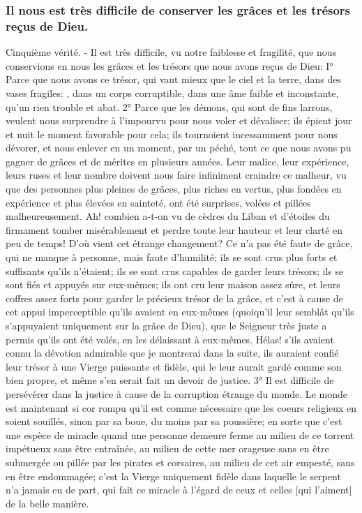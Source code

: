 \subsubsection{Il nous est très difficile de conserver les grâces et les trésors reçus de Dieu.}
 Cinquième vérité. - Il est très difficile, vu notre faiblesse et fragilité, que nous conservions en nous les grâces
et les trésors que nous avons reçus de Dieu:
I° Parce que nous avons ce trésor, qui vaut mieux que le ciel et la terre, dans des vases fragiles: , dans un corps corruptible, dans une âme faible et inconstante, qu'un rien
trouble et abat.
 2° Parce que les démons, qui sont de fins larrons, veulent nous surprendre à l'impourvu pour nous voler et
dévaliser; ils épient jour et nuit le moment favorable pour cela; ils tournoient incessamment pour nous dévorer, et
nous enlever en un moment, par un péché, tout ce que nous avons pu gagner de grâces et de mérites en plusieurs
années. Leur malice, leur expérience, leurs ruses et leur nombre doivent nous faire infiniment craindre ce malheur,
vu que des personnes plus pleines de grâces, plus riches en vertus, plus fondées en expérience et plus élevées
en sainteté, ont été surprises, volées et pillées malheureusement. Ah! combien a-t-on vu de cèdres du Liban et
d'étoiles du firmament tomber misérablement et perdre toute leur hauteur et leur clarté en peu de temps! D'où vient
cet étrange changement? Ce n'a pas été faute de grâce, qui ne manque à personne, mais faute d'humilité; ils se
sont crus plus forts et suffisants qu'ils n'étaient; ils se sont crus capables de garder leurs trésors; ils se sont fiés et
appuyés sur eux-mêmes; ils ont cru leur maison assez sûre, et leurs coffres assez forts pour garder le précieux
trésor de la grâce, et c'est à cause de cet appui imperceptible qu'ils avaient en eux-mêmes (quoiqu'il leur semblât
qu'ils s'appuyaient uniquement sur la grâce de Dieu), que le Seigneur très juste a permis qu'ils ont été volés, en les
délaissant à eux-mêmes. Hélas! s'ils avaient connu la dévotion admirable que je montrerai dans la suite, ils
auraient confié leur trésor à une Vierge puissante et fidèle, qui le leur aurait gardé comme son bien propre, et
même s'en serait fait un devoir de justice.
 3° Il est difficile de persévérer dans la justice à cause de la corruption étrange du monde. Le monde est
maintenant si cor rompu qu'il est comme nécessaire que les coeurs religieux en soient souillés, sinon par sa boue,
du moins par sa poussière; en sorte que c'est une espèce de miracle quand une personne demeure ferme au
milieu de ce torrent impétueux sans être entraînée, au milieu de cette mer orageuse sans en être submergée ou
pillée par les pirates et corsaires, au milieu de cet air empesté, sans en être endommagée; c'est la Vierge
uniquement fidèle dans laquelle le serpent n'a jamais eu de part, qui fait ce miracle à l'égard de ceux et celles [qui
l'aiment] de la belle manière.
